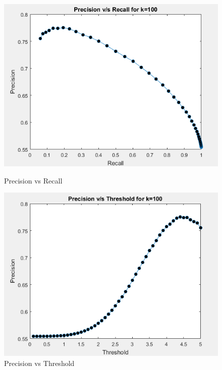 \documentclass[12pt, onecolumn]{IEEEtran}
\begin{document}
\begin{figure}[h!]
\centering
\begin{minipage}{.5\textwidth}
\centering
\captionsetup{justification=centering}
\includegraphics[width=0.9\linewidth]{Graphs/3-3}
\caption{Precision vs Recall}
\end{minipage}%
\begin{minipage}{.5\textwidth}
\centering
\captionsetup{justification=centering}
\includegraphics[width=0.9\linewidth]{Graphs/3-6}
\caption{Precision vs Threshold}
\end{minipage}
\end{figure}
\end{document}

